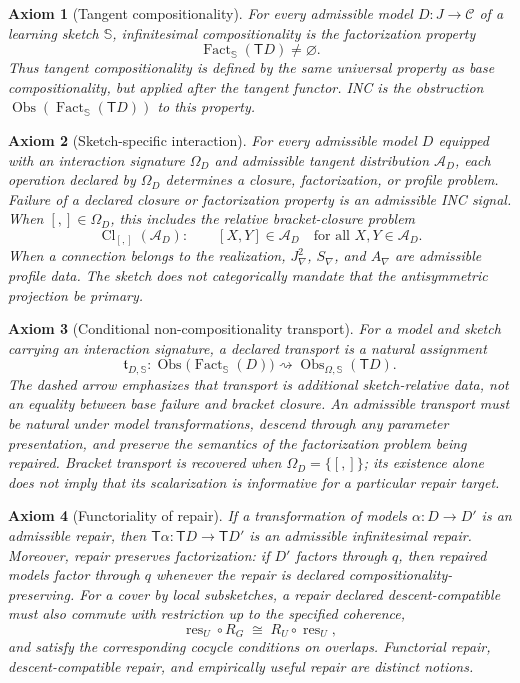 \documentclass{article}
\newtheorem{axiom}{Axiom}
\newcommand{\C}{\mathcal{C}}
\newcommand{\T}{\mathsf{T}}
\newcommand{\res}{\operatorname{res}}
\newcommand{\Fact}{\operatorname{Fact}}
\newcommand{\Cl}{\operatorname{Cl}}
\newcommand{\Obs}{\operatorname{Obs}}
\begin{document}
\begin{axiom}[Tangent compositionality]
For every admissible model \(D:J\to\C\) of a learning sketch \(\mathbb S\), infinitesimal compositionality is the factorization property
\[
\Fact_{\mathbb S}(\T D)\neq\varnothing.
\]
Thus tangent compositionality is defined by the same universal property as base compositionality, but applied after the tangent functor. INC is the obstruction \(\Obs(\Fact_{\mathbb S}(\T D))\) to this property.
\end{axiom}

\begin{axiom}[Sketch-specific interaction]
For every admissible model $D$ equipped with an interaction signature
$\Omega_D$ and admissible tangent distribution $\mathcal A_D$, each operation
declared by $\Omega_D$ determines a closure, factorization, or profile problem.
Failure of a declared closure or factorization property is an admissible INC
signal.  When $[,]\in\Omega_D$, this includes the relative bracket-closure
problem
\[
\Cl_{[,]}(\mathcal A_D):
\qquad
[X,Y]\in\mathcal A_D
\quad
\text{for all }X,Y\in\mathcal A_D.
\]
When a connection belongs to the realization, $J^2_\nabla$, $S_\nabla$, and
$A_\nabla$ are admissible profile data.  The sketch does not categorically
mandate that the antisymmetric projection be primary.
\end{axiom}

\begin{axiom}[Conditional non-compositionality transport]
For a model and sketch carrying an interaction signature, a declared transport
is a natural assignment
\[
\mathfrak t_{D,\mathbb S}:
\Obs\big(\Fact_{\mathbb S}(D)\big)
\rightsquigarrow
\Obs_{\Omega,\mathbb S}(\T D).
\]
The dashed arrow emphasizes that transport is additional sketch-relative data,
not an equality between base failure and bracket closure.  An admissible
transport must be natural under model transformations, descend through any
parameter presentation, and preserve the semantics of the factorization
problem being repaired.  Bracket transport is recovered when
$\Omega_D=\{[,]\}$; its existence alone does not imply that its scalarization
is informative for a particular repair target.
\end{axiom}

\begin{axiom}[Functoriality of repair]
If a transformation of models \(\alpha:D\to D'\) is an admissible repair, then \(\T\alpha:\T D\to\T D'\) is an admissible infinitesimal repair. Moreover, repair preserves factorization: if \(D'\) factors through \(q\), then repaired models factor through \(q\) whenever the repair is declared compositionality-preserving.
For a cover by local subsketches, a repair declared descent-compatible must
also commute with restriction up to the specified coherence,
\[
\res_U\circ R_G
\;\cong\;
R_U\circ\res_U,
\]
and satisfy the corresponding cocycle conditions on overlaps.  Functorial
repair, descent-compatible repair, and empirically useful repair are distinct
notions.
\end{axiom}
\end{document}
